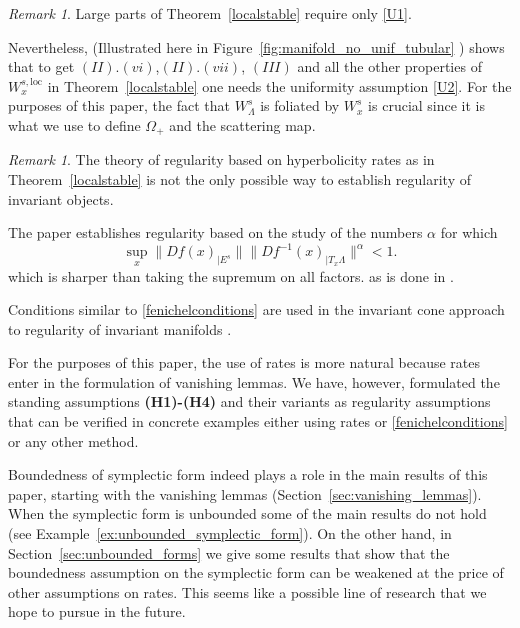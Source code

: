 \documentclass[11pt]{amsart}
\theoremstyle{definition}
\theoremstyle{remark}
\newtheorem{rem}[thm]{Remark}
\numberwithin{equation}{section}
\begin{document}
\begin{rem}
Large parts of Theorem~\ref{localstable} require only \eqref{U1}.



Nevertheless, \cite[Example~3.8]{Eldering12}
(Illustrated here in Figure~\ref{fig:manifold_no_unif_tubular} )
  shows  that to get
  $(II).(vi)$,$(II).(vii)$, $(III)$ and all
  the other properties of $W^{s,\textrm{loc}}_x$ in Theorem~\ref{localstable}
  one needs
    the uniformity assumption \eqref{U2}. For the purposes of this paper,
    the fact that $W^s_\Lambda$ is foliated by $W^s_x$ is crucial
    since it is what we use  to define $\Omega_+$ and the scattering map.



\end{rem}

\begin{rem}\label{alternative_regularity}
  The theory of regularity based on hyperbolicity rates
  as in Theorem~\ref{localstable} is
  not the only possible way to establish regularity of
  invariant objects.

  The paper \cite{Fenichel74}  establishes regularity
  based on the study of the numbers $\alpha$ for which
  \begin{equation} \label{fenichelconditions}
    \sup_x \|Df(x)_{\mid E^s}\| \|Df^{-1}(x)_{\mid T_x \Lambda}\|^\alpha  < 1.
    \end{equation}
  which is sharper than taking the supremum on all factors.
  as is done in \cite{HPS}.

  Conditions similar to \eqref{fenichelconditions}
  are used in the invariant cone approach to regularity
  of invariant manifolds \cite{CapinskiZ15}.

  For  the purposes of this paper, the use of rates is more natural
  because rates enter in the formulation of vanishing lemmas.
  We have, however, formulated the standing assumptions
  {\bf (H1)-(H4)} and their variants as regularity assumptions
  that can be verified in concrete examples either using rates
  or \eqref{fenichelconditions}  or any other method.
  \end{rem}







Boundedness of symplectic form indeed plays a role in the main results of
this paper, starting with the vanishing lemmas (Section~\ref{sec:vanishing_lemmas}).
When the symplectic form is unbounded some of the main results do not hold (see Example~\ref{ex:unbounded_symplectic_form}).
On the other hand,
in Section~\ref{sec:unbounded_forms} we give some results
that show that the boundedness assumption on the symplectic form
can be weakened at the price of other assumptions on rates. This seems
like a possible line of research that we hope to
pursue in the future.
\end{document}
